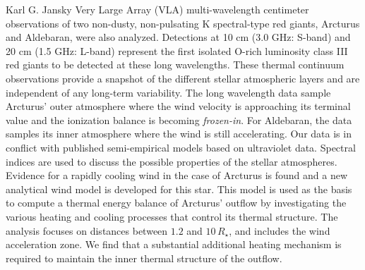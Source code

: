 \begin{abstracts}
Karl G. Jansky Very Large Array (VLA) multi-wavelength centimeter observations of two non-dusty, non-pulsating K spectral-type red giants, Arcturus and Aldebaran, were also analyzed. Detections at 10 cm (3.0 GHz: S-band) and 20 cm (1.5 GHz: L-band) represent the first isolated O-rich luminosity class III red giants to be detected at these long wavelengths. These thermal continuum observations provide  a snapshot of the different stellar atmospheric layers and are independent of any long-term variability. The long wavelength data sample Arcturus' outer atmosphere where the wind velocity is approaching its terminal value and the ionization balance is becoming \textit{frozen-in}. For Aldebaran, the data samples its inner atmosphere where the wind is still accelerating. Our data is in conflict with published semi-empirical models based on ultraviolet data. Spectral indices are used to discuss the possible properties of the stellar atmospheres. Evidence for a rapidly cooling wind in the case of Arcturus is found and a new analytical wind model is developed for this star. This model is used as the basis to compute a thermal energy balance of Arcturus' outflow by investigating the various heating and cooling processes that control its thermal structure. The analysis focuses on distances between $1.2$ and $10\,R_{\star}$, and includes the wind acceleration zone. We find that a substantial additional heating mechanism is required to maintain the inner thermal structure of the outflow.

\end{abstracts}

